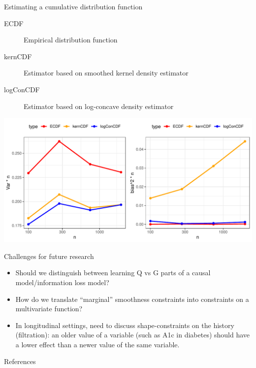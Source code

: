 \documentclass[smaller]{beamer}\usepackage{listings}
\begin{document}
\begin{frame}[label={sec:org0b2146b}]{Estimating a cumulative distribution function}
\small

\begin{description}
\item[{\color{red}ECDF}] Empirical distribution function
\item[{\color{orange}kernCDF}] Estimator based on smoothed kernel density estimator
\item[{\color{blue}logConCDF}] Estimator based on log-concave density estimator
\citep{dumbgen2009maximum,Rufibach_Duembgen_2023}
\end{description}

\includegraphics[width=1\textwidth]{./cdf-estimators.pdf}
\end{frame}


\begin{frame}[label={sec:orga8e14be}]{Challenges for future research}
\begin{itemize}
\item Should we distinguish between learning Q vs G parts of a causal
model/information loss model?

\item How do we translate ``marginal'' smoothness constraints into 
constraints on a multivariate function?

\item In longitudinal settings, need to discuss shape-constraints on the
history (filtration): an older value of a variable (such as A1c in
diabetes) should have a lower effect than a newer value of the same
variable.
\end{itemize}
\end{frame}

\begin{frame}[label={sec:org619d706}]{References}
\footnotesize 
\end{frame}
\end{document}
